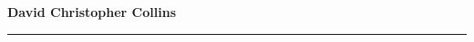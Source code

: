 \documentclass[10pt]{article}
\begin{document}
\noindent 
{\bf\large David Christopher Collins}%

\noindent
\rule[9pt]{6.5in}{.3mm}

\medskip

%  

 
%

\medskip
 
%

\medskip
 
%


%




%

%

%


%

\medskip

\medskip

   

\noindent
\end{document}
